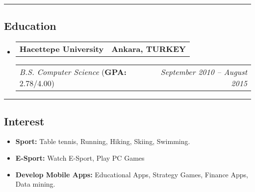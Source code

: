 \documentclass[11pt,letterpaper]{article}
\makeatletter
\newcommand{\headerrow}[2]
{\begin{tabular*}{\linewidth}{l@{\extracolsep{\fill}}r}
#1 &
#2 \\
\end{tabular*}}
\makeatother
\begin{document}
\hrule
\vspace{-1em}
\subsection*{\Large Education}

\begin{itemize}[leftmargin=1em]
	\parskip=0.1em
		
	\item
	      \headerrow
	      {\textbf{Hacettepe University}}
	      {\textbf{Ankara, TURKEY}}
	      \headerrow
	      {\emph{B.S. Computer Science} (\textbf{GPA:} 2.78/4.00)}
	      {\emph{September 2010 -- August 2015}}
	      	      
\end{itemize}

\hrule
\vspace{-1em}
\subsection*{\Large Interest}

\begin{itemize}[leftmargin=1em,noitemsep]
	\item \textbf{Sport:}
	      Table tennis, Running, Hiking, Skiing, Swimming.
	\item \textbf{E-Sport:}
	      Watch E-Sport, Play PC Games
	\item \textbf{Develop Mobile Apps:}
	      Educational Apps, Strategy Games, Finance Apps, Data mining.
\end{itemize}
\end{document}
